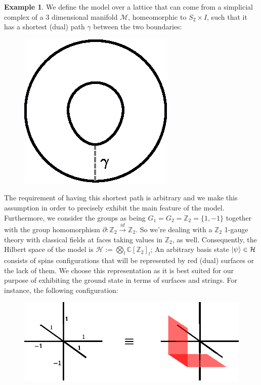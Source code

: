 \documentclass[a4paper,11pt]{article}
\theoremstyle{plain}%
\theoremstyle{definition}
\newtheorem{exmp}[thm]{Example}
\theoremstyle{remark}
\begin{document}
\begin{exmp}
We define the model over a lattice that can come from a simplicial complex of a 3 dimensional manifold $\mathcal{M}$, homeomorphic to $S_2 \times I$, such that it has a shortest (dual) path $\gamma$ between the two boundaries:
\begin{figure}[h!]
\centering
    \includegraphics[scale=0.7]{shortest.eps}

\end{figure}

The requirement of having this shortest path is arbitrary and we make this assumption in order to precisely exhibit the main feature of the model. Furthermore, we consider the groups as being $G_1=G_2=\mathbb{Z}_2=\{1,-1\}$ together with the group homomorphism $\partial:\mathbb{Z}_2 \xrightarrow{id} \mathbb{Z}_2$. So we're dealing with a $\mathbb{Z}_2$ 1-gauge theory with classical fields at faces taking values in $\mathbb{Z}_2$, as well. Consequently, the Hilbert space of the model is $\mathcal{H}:=\bigotimes_{l}\mathbb{C}[\mathbb{Z}_2]_l$; An arbitrary basis state $\ket{\psi} \in \mathcal{H}$ consists of spins configurations that will be represented by red (dual) surfaces or the lack of them. We choose this representation as it is best suited for our purpose of exhibiting the ground state in terms of surfaces and strings. For instance, the following configuration:
\begin{figure}[h!]
\centering
\includegraphics[scale=0.8]{graphstate.eps}
\end{figure}


\end{exmp}
\end{document}
